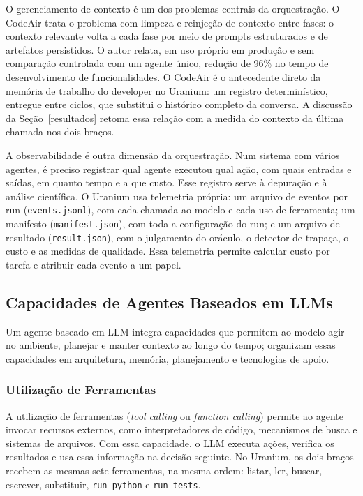 O gerenciamento de contexto é um dos problemas centrais da orquestração. O CodeAir \citep{CodeAir2025} trata o problema com limpeza e reinjeção de contexto entre fases: o contexto relevante volta a cada fase por meio de prompts estruturados e de artefatos persistidos. O autor relata, em uso próprio em produção e sem comparação controlada com um agente único, redução de 96\% no tempo de desenvolvimento de funcionalidades. O CodeAir é o antecedente direto da memória de trabalho do developer no Uranium: um registro determinístico, entregue entre ciclos, que substitui o histórico completo da conversa. A discussão da Seção~\ref{resultados} retoma essa relação com a medida do contexto da última chamada nos dois braços.

A observabilidade é outra dimensão da orquestração. Num sistema com vários agentes, é preciso registrar qual agente executou qual ação, com quais entradas e saídas, em quanto tempo e a que custo. Esse registro serve à depuração e à análise científica. O Uranium usa telemetria própria: um arquivo de eventos por run (\texttt{events.jsonl}), com cada chamada ao modelo e cada uso de ferramenta; um manifesto (\texttt{manifest.json}), com toda a configuração do run; e um arquivo de resultado (\texttt{result.json}), com o julgamento do oráculo, o detector de trapaça, o custo e as medidas de qualidade. Essa telemetria permite calcular custo por tarefa e atribuir cada evento a um papel.

\subsection{Capacidades de Agentes Baseados em LLMs}
\label{ssec:capacidades}

Um agente baseado em LLM integra capacidades que permitem ao modelo agir no ambiente, planejar e manter contexto ao longo do tempo; \cite{Harmony2025} organizam essas capacidades em arquitetura, memória, planejamento e tecnologias de apoio.

\subsubsection{Utilização de Ferramentas}

A utilização de ferramentas (\textit{tool calling} ou \textit{function calling}) permite ao agente invocar recursos externos, como interpretadores de código, mecanismos de busca e sistemas de arquivos. Com essa capacidade, o LLM executa ações, verifica os resultados e usa essa informação na decisão seguinte. No Uranium, os dois braços recebem as mesmas sete ferramentas, na mesma ordem: listar, ler, buscar, escrever, substituir, \texttt{run\_python} e \texttt{run\_tests}.

